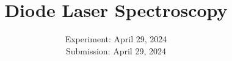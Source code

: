 

\subject{\texorpdfstring{\vspace{2ex}}{}V60\texorpdfstring{\vspace{-2ex}}{}} %
\title{Diode Laser Spectroscopy} %
\date{
	Experiment: April 29, 2024 %
	\\ Submission: April 29, 2024 %
}




\maketitle
\thispagestyle{empty}

\tableofcontents
\newpage









\printbibliography{}


